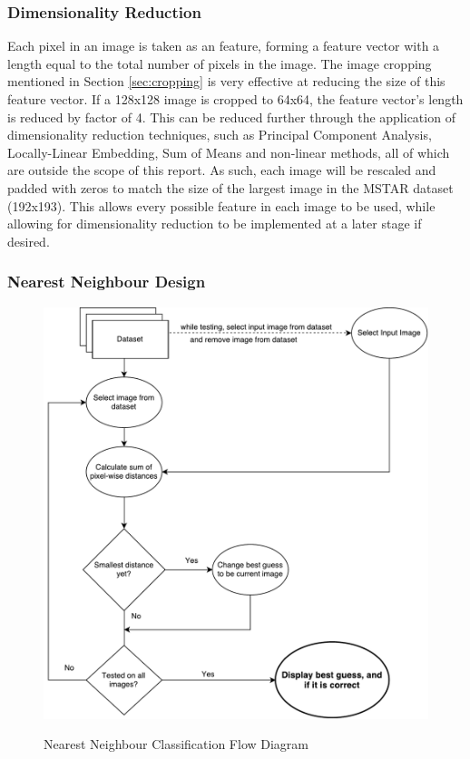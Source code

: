 \subsubsection{Dimensionality Reduction}
Each pixel in an image is taken as an feature, forming a feature vector with a length equal to the total number of pixels in the image. The image cropping mentioned in Section \ref{sec:cropping} is very effective at reducing the size of this feature vector. If a 128x128 image is cropped to 64x64, the feature vector's length is reduced by factor of 4. This can be reduced further through the application of dimensionality reduction techniques, such as Principal Component Analysis, Locally-Linear Embedding, Sum of Means and non-linear methods, all of which are outside the scope of this report. As such, each image will be rescaled and padded with zeros to match the size of the largest image in the MSTAR dataset (192x193). This allows every possible feature in each image to be used, while allowing for dimensionality reduction to be implemented at a later stage if desired.

\subsubsection{Nearest Neighbour Design}
\begin{figure}
\centering
\includegraphics[width=\textwidth]{figures/nearest-neighbour}
\label{fig:nn}
\caption{Nearest Neighbour Classification Flow Diagram}
\centering
\end{figure}


